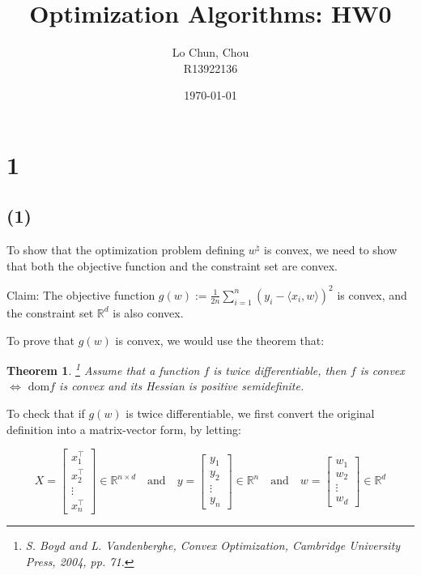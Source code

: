 \documentclass{article}
\title{Optimization Algorithms: HW0}
\author{Lo Chun, Chou \\ R13922136}
\date\today
\newtheorem*{theorem}{Theorem}
\begin{document}
\setlength{\parindent}{0pt}
\maketitle 

\section*{1}
\subsection*{(1)}

To show that the optimization problem defining $w^\natural$ is convex, 
we need to show that both the objective function and the constraint set are convex.
\bigskip

Claim: The objective function 
$g (w) := \frac{1}{2n} \sum_{i = 1}^n ( y_i - \langle x_i, w \rangle )^2$ is convex,
and the constraint set $\mathbb{R}^d$ is also convex.

\bigskip
To prove that $g(w)$ is convex, we would use the theorem that:

\begin{theorem}
    \footnote{S. Boyd and L. Vandenberghe, \textit{Convex Optimization}, Cambridge University Press, 2004, pp. 71.}
    Assume that a function $f$ is twice differentiable, then $f$ is convex $\Leftrightarrow$ 
    $\mathrm{dom} f$ is convex and its Hessian is positive semidefinite.
\end{theorem}

To check that if $g(w)$ is twice differentiable, we first convert the original definition into a matrix-vector form, by letting:

\begin{equation*}
    X = \begin{bmatrix}
        x_1^\intercal  \\
        x_2^\intercal  \\
        \vdots \\
        x_n^\intercal 
    \end{bmatrix} \in \mathbb{R}^{n \times d}
    \quad \text{and} \quad
    y = \begin{bmatrix}
        y_1 \\
        y_2 \\
        \vdots \\
        y_n
    \end{bmatrix} \in \mathbb{R}^n
    \quad \text{and} \quad
    w = \begin{bmatrix}
        w_1 \\
        w_2 \\
        \vdots \\
        w_d
    \end{bmatrix} \in \mathbb{R}^d
\end{equation*}
\end{document}
